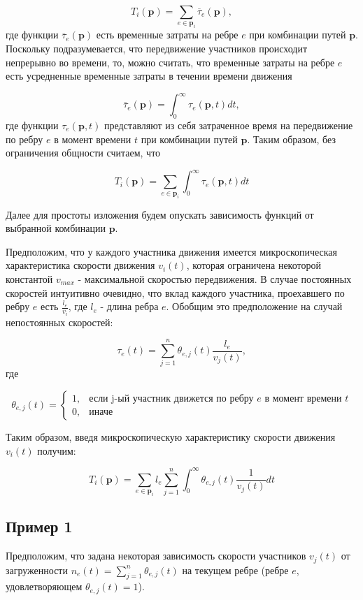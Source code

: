 \documentclass[12pt, a4paper]{article}
\begin{document}
$$T_i (\textbf{p}) = \sum \limits_{e \in \textbf{p}_i} \overline{\tau}_e (\textbf{p}), $$
где функции $\overline{\tau}_e (\textbf{p})$ есть временные затраты на ребре $e$ при комбинации путей $\textbf{p}$. Поскольку подразумевается, что передвижение участников происходит непрерывно во времени, то, можно считать, что временные затраты на ребре $e$ есть усредненные временные затраты в течении времени движения

$$ \overline{\tau}_e (\textbf{p}) = \int_{0}^{\infty} \tau_e (\textbf{p}, t) dt,$$
где функции  $\tau_e (\textbf{p}, t)$ представляют из себя затраченное время на передвижение по ребру $e$ в момент времени $t$ при комбинации путей $\textbf{p}$. Таким образом, без ограничения общности считаем, что

$$T_i (\textbf{p}) = \sum \limits_{e \in \textbf{p}_i} \int_{0}^{\infty} \tau_e (\textbf{p}, t) dt $$

Далее для простоты изложения будем опускать зависимость функций от выбранной комбинации $\textbf{p}$.

Предположим, что у каждого участника движения имеется микроскопическая характеристика скорости движения $v_i(t)$, которая ограничена некоторой константой $v_{max}$ - максимальной скоростью передвижения. В случае постоянных скоростей интуитивно очевидно, что вклад каждого участника, проехавшего по ребру $e$ есть $\frac{l_e}{v_i}$, где $l_e$ - длина ребра $e$. Обобщим это предположение на случай непостоянных скоростей:

$$  \tau_e (t) = \sum \limits_{j = 1}^n \theta_{e, j} (t) \frac{l_e}{v_j(t)}, $$
где 

$$
\theta_{e, j} (t) =
\begin{cases}
	1, & \text{если}  \text{ j-ый участник движется по ребру $e$ в момент времени $t$}  \\
	0, & \text{иначе}
\end{cases}
$$

Таким образом, введя микроскопическую характеристику скорости движения $v_i(t)$ получим:

$$T_i (\textbf{p}) = \sum \limits_{e \in \textbf{p}_i} l_e \sum \limits_{j = 1}^n \int_{0}^{\infty} \theta_{e, j} (t) \frac{1}{v_j(t)} dt $$


\subsection*{Пример 1}

Предположим, что задана некоторая зависимость скорости участников $v_j(t)$ от загруженности $n_e(t) = \sum\limits_{j = 1}^n\theta_{e, j} (t)$ на текущем ребре (ребре $e$, удовлетворяющем $\theta_{e, j} (t) = 1$).
\end{document}
